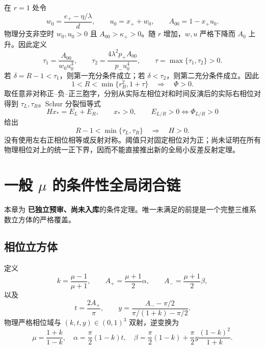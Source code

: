 \documentclass[UTF8,12pt,openany,fontset=fandol]{ctexrep}
\theoremstyle{definition}
\newcommand{\Reviewed}{\textcolor{blue!65!black}{\textbf{已独立预审、尚未入库}}}
\begin{document}
在 $r=1$ 处令
\begin{equation}
 w_0=\frac{e_+-\eta/\lambda}{d},\qquad
 u_0=x_++w_0,\qquad A_{00}=1-x_+u_0.
\end{equation}
物理分支非空时 $w_0,u_0>0$ 且 $A_{00}>\kappa_+>0$。随 $r$ 增加，$w,u$ 严格下降而 $A_0$ 上升。因此定义
\begin{equation}
 \tau_1=\frac{A_{00}}{w_0u_0^3},\qquad
 \tau_2=\frac{4\lambda^2p_+A_{00}}{p_-u_0^4},\qquad
 \tau=\max\{\tau_1,\tau_2\}>0.
\end{equation}
若 $\delta=R-1<\tau_1$，则第一充分条件成立；若 $\delta<\tau_2$，则第二充分条件成立。因此
\begin{equation}\label{eq:weakcontrast}
 1<R<\min\{r_B^2,1+\tau\}\quad\Longrightarrow\quad\Phi>0.
\end{equation}
取任意非对称正--负--正三胞字，分别从实际左相位对和时间反演后的实际右相位对得到 $\tau_L,\tau_R$。Schur 分裂恒等式
\begin{equation}
 Hx_*=E_L+E_R,\qquad x_*>0,\qquad E_{L/R}>0\iff\Phi_{L/R}>0
\end{equation}
给出
\begin{equation}
 R-1<\min\{\tau_L,\tau_R\}\quad\Longrightarrow\quad H>0.
\end{equation}
没有使用左右正相位相等或反射对称。阈值只对固定相位对为正；尚未证明在所有物理相位对上的统一正下界，因而不能直接推出新的全局小反差反射定理。

\chapter{一般 $\mu$ 的条件性全局闭合链}

本章为 \Reviewed 的条件定理。唯一未满足的前提是一个完整三维系数立方体的严格覆盖。

\section{相位立方体}

定义
\begin{equation}
 k=\frac{\mu-1}{\mu+1},\qquad A_+=\frac{\mu+1}{2}\alpha,\qquad
 A_-=\frac{\mu+1}{2}\beta,
\end{equation}
以及
\begin{equation}
 t=\frac{2A_+}{\pi},\qquad
 y=\frac{A_--\pi/2}{\pi/(1+k)-\pi/2}.
\end{equation}
物理严格相位域与 $(k,t,y)\in(0,1)^3$ 双射，逆变换为
\begin{equation}
 \mu=\frac{1+k}{1-k},\quad
 \alpha=\frac\pi2(1-k)t,\quad
 \beta=\frac\pi2(1-k)+\frac\pi2y\frac{(1-k)^2}{1+k}.
\end{equation}
\end{document}
